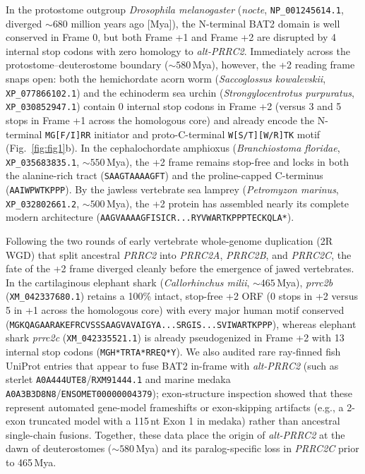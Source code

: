\documentclass[10pt,letterpaper]{article}
\newcommand{\spname}[1]{\textit{#1}}
\newcommand{\gene}[1]{\textit{#1}}
\begin{document}
In the protostome outgroup \spname{Drosophila melanogaster} (\gene{nocte}, \texttt{NP\_001245614.1}, diverged $\sim 680$ million years ago [Mya]), the N-terminal BAT2 domain is well conserved in Frame 0, but both Frame +1 and Frame +2 are disrupted by 4 internal stop codons with zero homology to \gene{alt-PRRC2}. Immediately across the protostome--deuterostome boundary ($\sim 580$\,Mya), however, the +2 reading frame snaps open: both the hemichordate acorn worm (\spname{Saccoglossus kowalevskii}, \texttt{XP\_077866102.1}) and the echinoderm sea urchin (\spname{Strongylocentrotus purpuratus}, \texttt{XP\_030852947.1}) contain 0 internal stop codons in Frame +2 (versus 3 and 5 stops in Frame +1 across the homologous core) and already encode the N-terminal \texttt{MG[F/I]RR} initiator and proto-C-terminal \texttt{W[S/T][W/R]TK} motif (Fig.~\ref{fig:fig1}b). In the cephalochordate amphioxus (\spname{Branchiostoma floridae}, \texttt{XP\_035683835.1}, $\sim 550$\,Mya), the +2 frame remains stop-free and locks in both the alanine-rich tract (\texttt{SAAGTAAAAGFT}) and the proline-capped C-terminus (\texttt{AAIWPWTKPPP}). By the jawless vertebrate sea lamprey (\spname{Petromyzon marinus}, \texttt{XP\_032802661.2}, $\sim 500$\,Mya), the +2 protein has assembled nearly its complete modern architecture (\texttt{AAGVAAAAGFISICR...RYVWARTKPPPTECKQLA*}).

Following the two rounds of early vertebrate whole-genome duplication (2R WGD) that split ancestral \gene{PRRC2} into \gene{PRRC2A}, \gene{PRRC2B}, and \gene{PRRC2C}, the fate of the +2 frame diverged cleanly before the emergence of jawed vertebrates. In the cartilaginous elephant shark (\spname{Callorhinchus milii}, $\sim 465$\,Mya), \gene{prrc2b} (\texttt{XM\_042337680.1}) retains a 100\% intact, stop-free +2 ORF (0 stops in +2 versus 5 in +1 across the homologous core) with every major human motif conserved (\texttt{MGKQAGAARAKEFRCVSSSAAGVAVAIGYA...SRGIS...SVIWARTKPPP}), whereas elephant shark \gene{prrc2c} (\texttt{XM\_042335521.1}) is already pseudogenized in Frame +2 with 13 internal stop codons (\texttt{MGH*TRTA*RREQ*Y}). We also audited rare ray-finned fish UniProt entries that appear to fuse BAT2 in-frame with \gene{alt-PRRC2} (such as sterlet \texttt{A0A444UTE8}/\texttt{RXM91444.1} and marine medaka \texttt{A0A3B3D8N8}/\texttt{ENSOMET00000004379}); exon-structure inspection showed that these represent automated gene-model frameshifts or exon-skipping artifacts (e.g., a 2-exon truncated model with a 115\,nt Exon 1 in medaka) rather than ancestral single-chain fusions. Together, these data place the origin of \gene{alt-PRRC2} at the dawn of deuterostomes ($\sim 580$\,Mya) and its paralog-specific loss in \gene{PRRC2C} prior to 465\,Mya.
\end{document}

